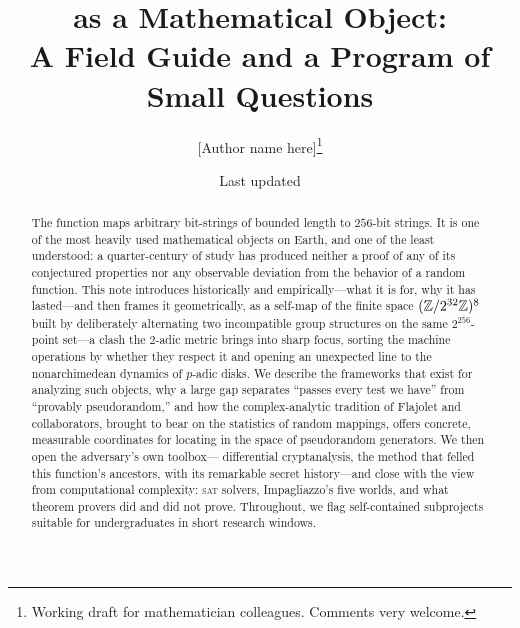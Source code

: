 %
%
\providecommand{\DocPdfTitle}{SHA-256 as a Mathematical Object}


\title{\SHA{} as a Mathematical Object:\\
       \large A Field Guide and a Program of Small Questions}
\author{[Author name here]\thanks{Working draft for mathematician
  colleagues. Comments very welcome.}}
\date{Last updated \lastupdated}


\maketitle

\begin{abstract}
\noindent
The function \SHA{} maps arbitrary bit-strings of bounded length to
$256$-bit strings. It is one of the most heavily used mathematical objects
on Earth, and one of the least understood: a quarter-century of study has
produced neither a proof of any of its conjectured properties nor any
observable deviation from the behavior of a random function. This note
introduces \SHA{} historically and empirically---what it is for, why it has
lasted---and then frames it geometrically, as a self-map of the finite space
$(\mathbb{Z}/2^{32}\mathbb{Z})^8$ built by deliberately alternating two incompatible group
structures on the same $2^{256}$-point set---a clash the $2$-adic metric
brings into sharp focus, sorting the machine operations by whether they
respect it and opening an unexpected line to the nonarchimedean dynamics
of $p$-adic disks. We describe the frameworks that
exist for analyzing such objects, why a large gap separates ``passes every
test we have'' from ``provably pseudorandom,'' and how the
complex-analytic tradition of Flajolet and collaborators, brought to bear
on the statistics of random mappings, offers concrete, measurable
coordinates for locating \SHA{} in the space of pseudorandom generators. We then open the adversary's own toolbox---%
differential cryptanalysis, the method that felled this function's
ancestors, with its remarkable secret history---and close with the view
from computational complexity: \textsc{sat} solvers, Impagliazzo's five
worlds, and what theorem provers did and did not prove. Throughout, we flag self-contained subprojects
suitable for undergraduates in short research windows.
\end{abstract}

